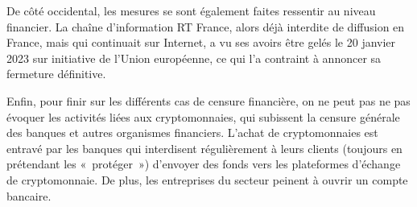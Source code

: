 De côté occidental, les mesures se sont également faites ressentir au niveau financier. La chaîne d'information RT France, alors déjà interdite de diffusion en France, mais qui continuait sur Internet, a vu ses avoirs être gelés le 20 janvier 2023 sur initiative de l'Union européenne, ce qui l'a contraint à annoncer sa fermeture définitive.

Enfin, pour finir sur les différents cas de censure financière, on ne peut pas ne pas évoquer les activités liées aux cryptomonnaies, qui subissent la censure générale des banques et autres organismes financiers. L'achat de cryptomonnaies est entravé par les banques qui interdisent régulièrement à leurs clients (toujours en prétendant les «~protéger~») d'envoyer des fonds vers les plateformes d'échange de cryptomonnaie. De plus, les entreprises du secteur peinent à ouvrir un compte bancaire.

